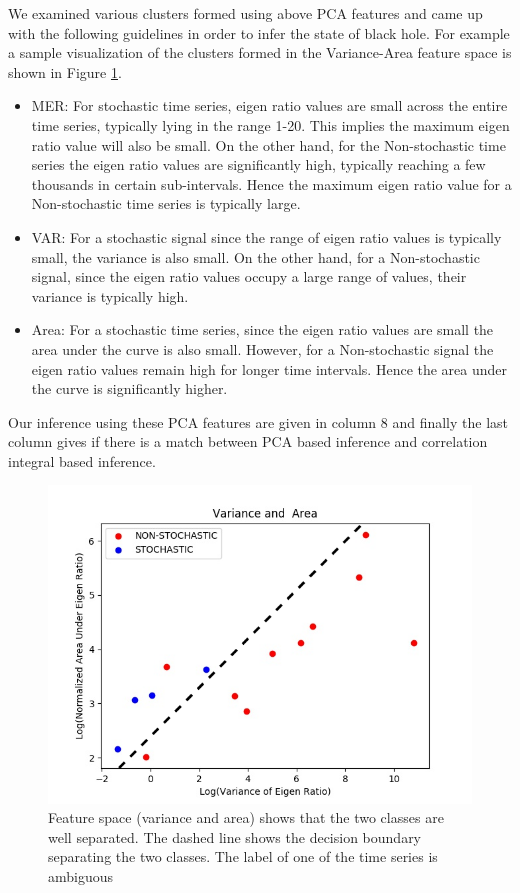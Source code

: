 \documentclass[10pt,conference]{IEEEtran}
\begin{document}
We examined various clusters formed using above PCA features and came up with the following guidelines in order to infer the state of black hole. For example a sample visualization of the clusters formed in the Variance-Area feature space is shown in Figure \ref{fig:variance_area_fs}.

\begin{itemize}
  \item MER: For stochastic time series, eigen ratio values are small across the entire time series, typically lying in the range 1-20. This implies the maximum eigen ratio value will also be small. On the other hand, for the Non-stochastic time series the eigen ratio values are significantly high, typically reaching a few thousands in certain sub-intervals. Hence the maximum eigen ratio value for a Non-stochastic time series is typically large.
  \item VAR: For a stochastic signal since the range of eigen ratio values is typically small, the variance is also small. On the other hand, for a Non-stochastic signal, since the eigen ratio values occupy a large range of values, their variance is typically high.
  \item Area: For a stochastic time series, since the eigen ratio values are small the area under the curve is also small. However, for a Non-stochastic signal the eigen ratio values remain high for longer time intervals. Hence the area under the curve is significantly higher.
\end{itemize}

Our inference using these PCA features are given in column 8 and finally the last column gives if there is a match between PCA based inference and correlation integral based inference.

\begin{figure}
    \centering
    \includegraphics[width=.9\linewidth]{var_area_fs.drawio.png}
    \caption{Feature space (variance and area) shows that the two classes are well separated. The dashed line shows the decision boundary separating the two classes. The label of one of the time series is ambiguous}
    \label{fig:variance_area_fs}
\end{figure}
\end{document}
